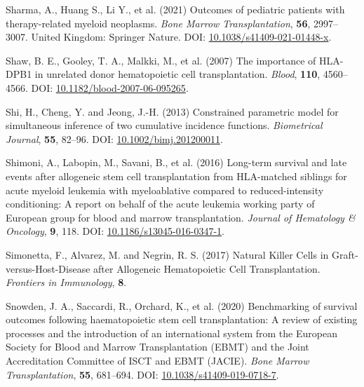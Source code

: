 \documentclass[
  letterpaper,
  DIV=11,
  numbers=noendperiod]{scrreprt}
\newlength{\cslhangindent}
\newenvironment{CSLReferences}[2] %
 {\begin{list}{}{%
  \setlength{\itemindent}{0pt}
  \setlength{\leftmargin}{0pt}
  \setlength{\parsep}{0pt}
  \ifodd #1
   \setlength{\leftmargin}{\cslhangindent}
   \setlength{\itemindent}{-1\cslhangindent}
  \fi
  \setlength{\itemsep}{#2\baselineskip}}}
 {\end{list}}
\begin{document}
\begin{CSLReferences}{1}{1}
Sharma, A., Huang S., Li Y., et al. (2021) Outcomes of pediatric
patients with therapy-related myeloid neoplasms. \emph{Bone Marrow
Transplantation}, \textbf{56}, 2997--3007. United Kingdom: Springer
Nature. DOI:
\href{https://doi.org/10.1038/s41409-021-01448-x}{10.1038/s41409-021-01448-x}.

Shaw, B. E., Gooley, T. A., Malkki, M., et al. (2007) The importance of
{HLA-DPB1} in unrelated donor hematopoietic cell transplantation.
\emph{Blood}, \textbf{110}, 4560--4566. DOI:
\href{https://doi.org/10.1182/blood-2007-06-095265}{10.1182/blood-2007-06-095265}.

Shi, H., Cheng, Y. and Jeong, J.-H. (2013) Constrained parametric model
for simultaneous inference of two cumulative incidence functions.
\emph{Biometrical Journal}, \textbf{55}, 82--96. DOI:
\href{https://doi.org/10.1002/bimj.201200011}{10.1002/bimj.201200011}.

Shimoni, A., Labopin, M., Savani, B., et al. (2016) Long-term survival
and late events after allogeneic stem cell transplantation from
{HLA-matched} siblings for acute myeloid leukemia with myeloablative
compared to reduced-intensity conditioning: A report on behalf of the
acute leukemia working party of {European} group for blood and marrow
transplantation. \emph{Journal of Hematology \& Oncology}, \textbf{9},
118. DOI:
\href{https://doi.org/10.1186/s13045-016-0347-1}{10.1186/s13045-016-0347-1}.

Simonetta, F., Alvarez, M. and Negrin, R. S. (2017) Natural {Killer
Cells} in {Graft-versus-Host-Disease} after {Allogeneic Hematopoietic
Cell Transplantation}. \emph{Frontiers in Immunology}, \textbf{8}.

Snowden, J. A., Saccardi, R., Orchard, K., et al. (2020) Benchmarking of
survival outcomes following haematopoietic stem cell transplantation:
{A} review of existing processes and the introduction of an
international system from the {European Society} for {Blood} and {Marrow
Transplantation} ({EBMT}) and the {Joint Accreditation Committee} of
{ISCT} and {EBMT} ({JACIE}). \emph{Bone Marrow Transplantation},
\textbf{55}, 681--694. DOI:
\href{https://doi.org/10.1038/s41409-019-0718-7}{10.1038/s41409-019-0718-7}.


\end{CSLReferences}
\end{document}
